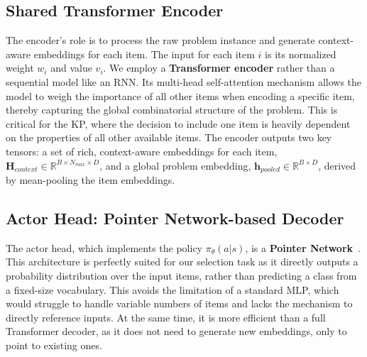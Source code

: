 \subsection{Shared Transformer Encoder}
The encoder's role is to process the raw problem instance and generate context-aware embeddings for each item. The input for each item \(i\) is its normalized weight \(w_i\) and value \(v_i\). We employ a \textbf{Transformer encoder} rather than a sequential model like an RNN. Its multi-head self-attention mechanism allows the model to weigh the importance of all other items when encoding a specific item, thereby capturing the global combinatorial structure of the problem. This is critical for the KP, where the decision to include one item is heavily dependent on the properties of all other available items. The encoder outputs two key tensors: a set of rich, context-aware embeddings for each item, \(\mathbf{H}_{context} \in \mathbb{R}^{B \times N_{max} \times D}\), and a global problem embedding, \(\mathbf{h}_{pooled} \in \mathbb{R}^{B \times D}\), derived by mean-pooling the item embeddings.

\subsection{Actor Head: Pointer Network-based Decoder}
The actor head, which implements the policy \(\pi_\theta(a|s)\), is a \textbf{Pointer Network}~\cite{vinyalsPointerNetworks2017}. This architecture is perfectly suited for our selection task as it directly outputs a probability distribution over the input items, rather than predicting a class from a fixed-size vocabulary. This avoids the limitation of a standard MLP, which would struggle to handle variable numbers of items and lacks the mechanism to directly reference inputs. At the same time, it is more efficient than a full Transformer decoder, as it does not need to generate new embeddings, only to point to existing ones.

